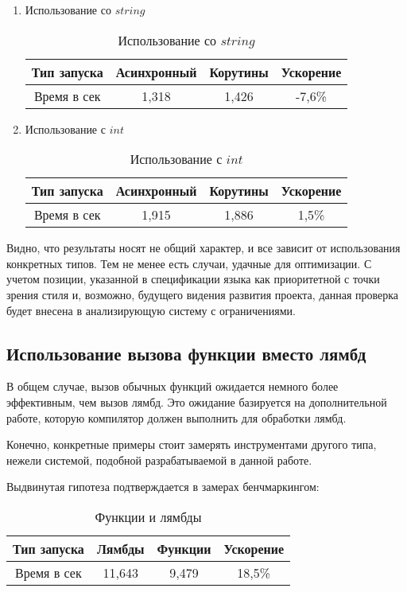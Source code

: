 \documentclass{mipt-thesis-bs}
\begin{document}
\begin{enumerate}
    \item Использование со $string$
    \begin{table}[h]
        \centering
        \begin{tabular}{|c|c|c|c|}
          \hline
          Тип запуска & Асинхронный & Корутины & Ускорение \\
          \hline
          Время в сек & 1,318 & 1,426 & -7,6\% \\
          \hline
        \end{tabular}
        \caption{Использование со $string$}
      \end{table}
    \item Использование с $int$
    \begin{table}[h]
        \centering
        \begin{tabular}{|c|c|c|c|}
          \hline
          Тип запуска & Асинхронный & Корутины & Ускорение \\
          \hline
          Время в сек & 1,915 & 1,886 & 1,5\% \\
          \hline
        \end{tabular}
        \caption{Использование с $int$}
      \end{table}
\end{enumerate}

Видно, что результаты носят не общий характер, и все зависит от использования
конкретных типов. Тем не менее есть случаи, удачные для оптимизации. С учетом
позиции, указанной в спецификации языка как приоритетной с точки зрения стиля и,
возможно, будущего видения развития проекта, данная проверка будет внесена в
анализирующую систему с ограничениями.

\subsection{Использование вызова функции вместо лямбд}

В общем случае, вызов обычных функций ожидается немного
более эффективным, чем вызов лямбд. Это ожидание базируется на
дополнительной работе, которую компилятор должен выполнить для обработки лямбд.

Конечно, конкретные примеры стоит замерять инструментами другого типа, нежели
системой, подобной разрабатываемой в данной работе.

Выдвинутая гипотеза подтверждается в замерах бенчмаркингом:

\begin{table}[h]
    \centering
    \begin{tabular}{|c|c|c|c|}
      \hline
      Тип запуска & Лямбды & Функции & Ускорение \\
      \hline
      Время в сек & 11,643 & 9,479  & 18,5\% \\
      \hline
    \end{tabular}
    \caption{Функции и лямбды}
  \end{table}
\end{document}
